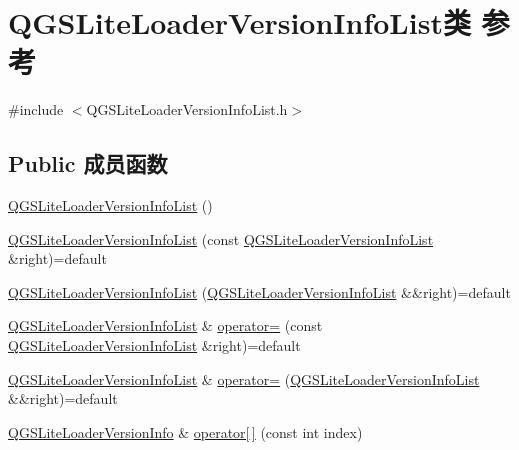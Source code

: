 \hypertarget{class_q_g_s_lite_loader_version_info_list}{}\section{Q\+G\+S\+Lite\+Loader\+Version\+Info\+List类 参考}
\label{class_q_g_s_lite_loader_version_info_list}


{\ttfamily \#include $<$Q\+G\+S\+Lite\+Loader\+Version\+Info\+List.\+h$>$}

\subsection*{Public 成员函数}
\begin{DoxyCompactItemize}
\item 
\mbox{\hyperlink{class_q_g_s_lite_loader_version_info_list_a4faa41a9bd3602858fb402d07d59e3f0}{Q\+G\+S\+Lite\+Loader\+Version\+Info\+List}} ()
\item 
\mbox{\hyperlink{class_q_g_s_lite_loader_version_info_list_a70e1feb6d6ea9e8d5429ccaf27d93be2}{Q\+G\+S\+Lite\+Loader\+Version\+Info\+List}} (const \mbox{\hyperlink{class_q_g_s_lite_loader_version_info_list}{Q\+G\+S\+Lite\+Loader\+Version\+Info\+List}} \&right)=default
\item 
\mbox{\hyperlink{class_q_g_s_lite_loader_version_info_list_ae6a3b7fb1666590c5bcdee63a20aff99}{Q\+G\+S\+Lite\+Loader\+Version\+Info\+List}} (\mbox{\hyperlink{class_q_g_s_lite_loader_version_info_list}{Q\+G\+S\+Lite\+Loader\+Version\+Info\+List}} \&\&right)=default
\item 
\mbox{\hyperlink{class_q_g_s_lite_loader_version_info_list}{Q\+G\+S\+Lite\+Loader\+Version\+Info\+List}} \& \mbox{\hyperlink{class_q_g_s_lite_loader_version_info_list_aa5d7b86337fafba6544d6aaf76b512b2}{operator=}} (const \mbox{\hyperlink{class_q_g_s_lite_loader_version_info_list}{Q\+G\+S\+Lite\+Loader\+Version\+Info\+List}} \&right)=default
\item 
\mbox{\hyperlink{class_q_g_s_lite_loader_version_info_list}{Q\+G\+S\+Lite\+Loader\+Version\+Info\+List}} \& \mbox{\hyperlink{class_q_g_s_lite_loader_version_info_list_a3588215bee6aa1dc655359fcb27e4d3c}{operator=}} (\mbox{\hyperlink{class_q_g_s_lite_loader_version_info_list}{Q\+G\+S\+Lite\+Loader\+Version\+Info\+List}} \&\&right)=default
\item 
\mbox{\hyperlink{class_q_g_s_lite_loader_version_info}{Q\+G\+S\+Lite\+Loader\+Version\+Info}} \& \mbox{\hyperlink{class_q_g_s_lite_loader_version_info_list_ab38f1e539c615b4b52b4d482f9251f0c}{operator\mbox{[}$\,$\mbox{]}}} (const int index)

\end{DoxyCompactItemize}
